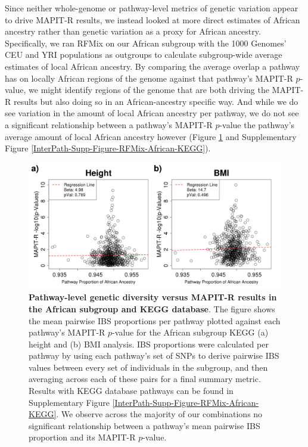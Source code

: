 \documentclass[12pt,a4paper]{article}
\begin{document}
Since neither whole-genome or pathway-level metrics of genetic variation appear to drive MAPIT-R results, we instead looked at more direct estimates of African ancestry rather than genetic variation as a proxy for African ancestry. Specifically, we ran RFMix \citep{Maples2013} on our African subgroup with the 1000 Genomes' CEU and YRI \citep{Genomes2015} populations as outgroups to calculate subgroup-wide average estimates of local African ancestry. By comparing the average overlap a pathway has on locally African regions of the genome against that pathway's MAPIT-R $p$-value, we might identify regions of the genome that are both driving the MAPIT-R results but also doing so in an African-ancestry specific way. And while we do see variation in the amount of local African ancestry per pathway, we do not see a significant relationship between a pathway's MAPIT-R $p$-value the pathway's average amount of local African ancestry however (Figure \ref{InterPath-Main-Figure-RFMix-African-REACTOME} and Supplementary Figure \ref{InterPath-Supp-Figure-RFMix-African-KEGG}).    

\begin{figure}[htb]
\centering
\includegraphics[scale=.35]{Images/Main/InterPath_Main_Figure_RFMix_vs2_African_REACTOME_noHLA.png}
\caption[TBD]{\textbf{Pathway-level genetic diversity versus MAPIT-R results in the African subgroup and KEGG database}. The figure shows the mean pairwise IBS proportions per pathway plotted against each pathway's MAPIT-R $p$-value for the African subgroup KEGG (a) height and (b) BMI analysis. IBS proportions were calculated per pathway by using each pathway's set of SNPs to derive pairwise IBS values between every set of individuals in the subgroup, and then averaging across each of these pairs for a final summary metric. Results with KEGG database pathways can be found in Supplementary Figure \ref{InterPath-Supp-Figure-RFMix-African-KEGG}. We observe across the majority of our combinations no significant relationship between a pathway's mean pairwise IBS proportion and its MAPIT-R $p$-value.}
\label{InterPath-Main-Figure-RFMix-African-REACTOME}
\end{figure}
\end{document}
